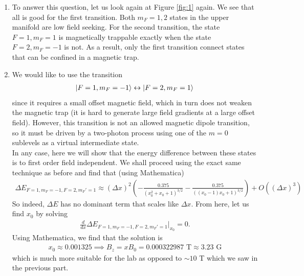 \documentclass{article}
\theoremstyle{definition}
\newcommand{\f}[2]{\frac{#1}{#2}}
\begin{document}
\begin{enumerate}[label=(\alph*)]
	
	
	\item To answer this question, let us look again at Figure \ref{fig:1} again. We see that all is good for the first transition. Both $m_F = 1,2$ states in the upper manifold are low field seeking. For the second transition, the state $F=1,m_F=1$ is magnetically trappable exactly when the state $F=2,m_F=-1$ is not. As a result, only the first transition connect states that can be confined in a magnetic trap. 
	
	\item We would like to use the transition
	\begin{align*}
	\ket{F=1,m_F=-1} \leftrightarrow \ket{F=2, m_F=1}
	\end{align*}
	since it requires a small offset magnetic field, which in turn does not weaken the magnetic trap (it is hard to generate large field gradients at a large offset field). However, this transition is not an allowed magnetic dipole transition, so it must be driven by a two-photon process using one of the $m=0$ sublevels as a virtual intermediate state. \\
	
	In any case, here we will show that the energy difference between these states is to first order field independent. We shall proceed using the exact same technique as before and find that (using Mathematica)
	\begin{align*}
	\Delta E_{F=1,m_F=-1,F=2,m_F'=1} \approx  (\Delta x)^2 \left(-\frac{0.375}{\left(x_0^2+x_0+1\right)^{3/2}}-\frac{0.375}{((x_0-1) x_0+1)^{3/2}}\right)+O\left((\Delta x)^3\right)
	\end{align*}
	So indeed, $\Delta E$ has no dominant term that scales like $\Delta x$. From here, let us find $x_0$ by solving 
	\begin{align*}
	\f{d}{dx}\Delta E_{F=1,m_F=-1,F=2,m_F'=1} \bigg\vert_{x_0} = 0.
	\end{align*}
	Using Mathematica, we find that the solution is 
	\begin{align*}
	x_0 \approx 0.001325 \implies B_z = x B_0 = 0.000322987 \text{ T} \approx \boxed{3.23 \text{ G}}
	\end{align*}
	which is much more suitable for the lab as opposed to $\sim 10$ T which we saw in the previous part.  
	
	
	

\end{enumerate}
\end{document}
